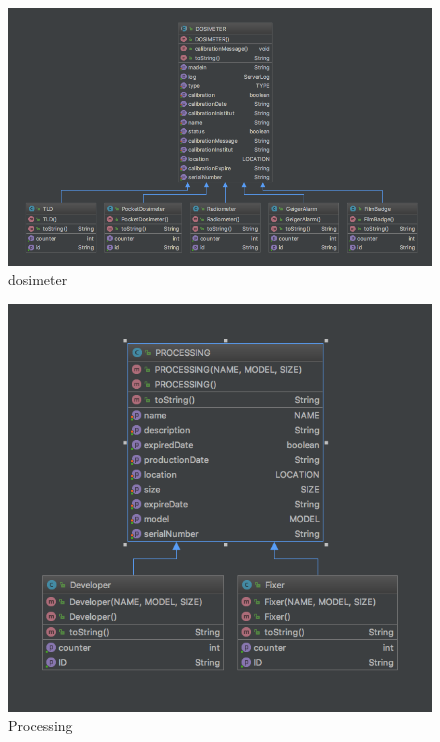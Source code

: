 \begin{figure}
\centering
\includegraphics[scale=0.6]{img/diagrams/dosimeter.png}
 \caption{dosimeter}
 \label{sec:Dosimeter}
\end{figure}

\begin{figure}
\centering
\includegraphics[scale=0.6]{img/diagrams/processing.png}
 \caption{Processing}
 \label{sec:processing}
\end{figure}

